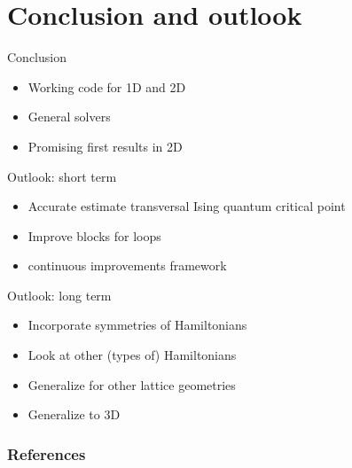 \documentclass[aspectratio=169]{beamer}
\begin{document}



\section{Conclusion and outlook}
\begin{frame}{Conclusion}
    \begin{itemize}
        \item Working code for 1D and 2D
        \item General solvers
        \item Promising first results in 2D
    \end{itemize}
\end{frame}


\begin{frame}{Outlook: short term}
    \begin{itemize}
        \item Accurate estimate transversal Ising quantum critical point
        \item Improve blocks for loops
        \item continuous improvements framework
    \end{itemize}
\end{frame}


\begin{frame}{Outlook: long term}
    \begin{itemize}
        \item Incorporate symmetries of Hamiltonians
        \item Look at other (types of) Hamiltonians
        \item Generalize for other lattice geometries
        \item Generalize to 3D
    \end{itemize}
\end{frame}

\begin{frame}[allowframebreaks]
    \frametitle{References}
    
    
\end{frame}
\end{document}
